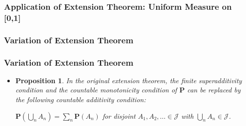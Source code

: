\documentclass[handout]{beamer}
\newtheorem{Proposition}[theorem]{Proposition}%
\newcommand{\BP}{\mathbf{P}}
\begin{document}
\subsubsection{Application of Extension Theorem: Uniform Measure on [0,1]}



\subsubsection{Variation of Extension Theorem}
\frame
{
  \frametitle{Variation of Extension Theorem}

   \begin{itemize}

            
         \item<1->[]    \begin{Proposition} In the original extension theorem, the finite superadditivity condition and the countable monotonicity condition of $\mathbf{P}$ can be replaced by the following countable additivity condition:
            
                    $\BP(\bigcup_{n} A_n)= \sum_{n} \BP(A_n)$ for disjoint $A_1,A_2,\ldots \in\mathcal{J}$ with $\bigcup_{n} A_n  \in\mathcal{J}$.
            
            \end{Proposition}    
       
                                           

                   \end{itemize}
}
\end{document}
